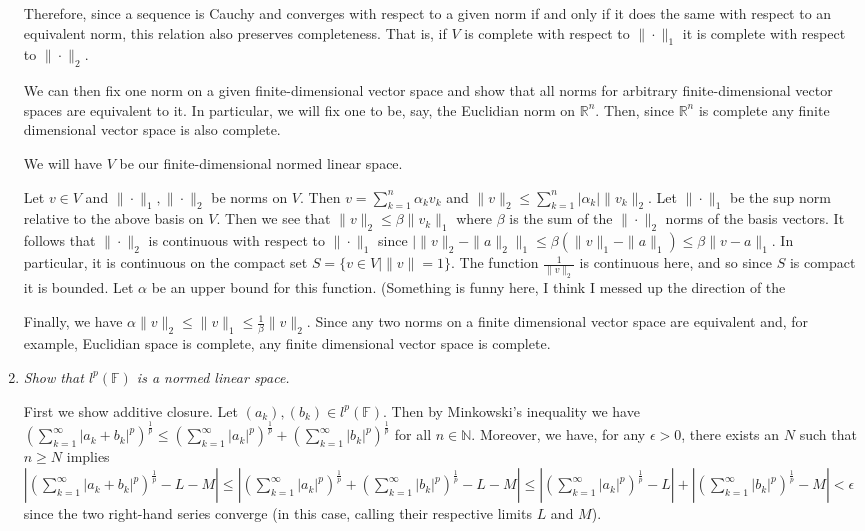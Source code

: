 \documentclass[11pt]{article}
\begin{document}
\begin{enumerate}
Therefore, since a sequence is Cauchy and converges with respect to a given norm if and only if it does the same with respect to an equivalent norm, this relation also preserves completeness.  That is, if $V$ is complete with respect to 
$\|\cdot\|_1$ it is complete with respect to $\|\cdot\|_2$.

We can then fix one norm on a given finite-dimensional vector space and show that all norms for arbitrary finite-dimensional vector spaces are equivalent to it.  In particular, we will fix one to be, say, the Euclidian norm on $\mathbb{R}^n$.  Then, since $\mathbb{R}^n$ is complete any finite dimensional vector space is also complete.

We will have $V$ be our finite-dimensional normed linear space.

Let $v \in V$ and $\|\cdot\|_1,\|\cdot\|_2$ be norms on $V$.  Then $v = \sum_{k=1}^n \alpha_kv_k$ and $\|v\|_2 \leq \sum_{k=1}^n |\alpha_k|\|v_k\|_2$.  Let $\|\cdot\|_1$ be the sup norm relative to the above basis on $V$.  Then we see that $\|v\|_2 \leq \beta \|v_k\|_1$ where $\beta$ is the sum of the $\|\cdot\|_2$ norms of the basis vectors.  It follows that $\|\cdot\|_2$ is continuous with respect to $\|\cdot\|_1$ since $|\|v\|_2 - \|a\|_2\|_1 \leq \beta(\|v\|_1 - \|a\|_1) \leq \beta\|v-a\|_1$.  In particular, it is continuous on the compact set $S = \{v \in V \mid \|v\|=1\}$.  The function $\frac{1}{\|v\|_2}$ is continuous here, and so since $S$ is compact it is bounded.  Let $\alpha$ be an upper bound for this function.  (Something is funny here, I think I messed up the direction of the 

Finally, we have $\alpha\|v\|_2 \leq \|v\|_1 \leq \frac{1}{\beta} \|v\|_2$.  Since any two norms on a finite dimensional vector space are equivalent and, for example, Euclidian space is complete, any finite dimensional vector space is complete.

\item \emph{Show that $l^p(\mathbb{F})$ is a normed linear space.}

First we show additive closure.  Let $(a_k),(b_k) \in l^p(\mathbb{F})$.  Then by Minkowski's inequality we have $\left(\sum_{k=1}^{\infty}|a_k + b_k|^p\right)^{\frac{1}{p}} \leq \left(\sum_{k=1}^{\infty}|a_k|^p\right)^{\frac{1}{p}} + \left(\sum_{k=1}^{\infty}|b_k|^p\right)^{\frac{1}{p}}$ for all $n \in \mathbb{N}$.  Moreover, we have, for any $\epsilon > 0$, there exists an $N$ such that $n \geq N$ implies $|\left(\sum_{k=1}^{\infty}|a_k + b_k|^p\right)^{\frac{1}{p}} - L - M| \leq |\left(\sum_{k=1}^{\infty}|a_k|^p\right)^{\frac{1}{p}} + \left(\sum_{k=1}^{\infty}|b_k|^p\right)^{\frac{1}{p}} - L - M| \leq |\left(\sum_{k=1}^{\infty}|a_k|^p\right)^{\frac{1}{p}} - L| +  |\left(\sum_{k=1}^{\infty}|b_k|^p\right)^{\frac{1}{p}} - M| < \epsilon$ since the two right-hand series converge (in this case, calling their respective limits $L$ and $M$).


\end{enumerate}
\end{document}
